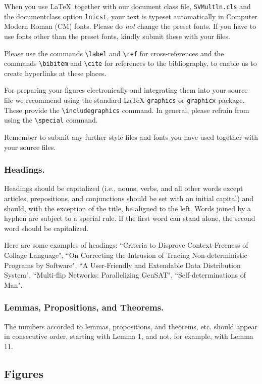 \documentclass[lnicst,sechang,a4paper]{svmultln}
\begin{document}
When you use \LaTeX\ together with our document class file,
\texttt{SVMultln.cls} and the documentclass option \texttt{lnicst},
your text is typeset automatically in Computer Modern Roman (CM) fonts.
Please do
\emph{not} change the preset fonts. If you have to use fonts other
than the preset fonts, kindly submit these with your files.

Please use the commands \verb+\label+ and \verb+\ref+ for
cross-references and the commands \verb+\bibitem+ and \verb+\cite+ for
references to the bibliography, to enable us to create hyperlinks at
these places.

For preparing your figures electronically and integrating them into
your source file we recommend using the standard \LaTeX{} \verb+graphics+ or
\verb+graphicx+ package. These provide the \verb+\includegraphics+ command.
In general, please refrain from using the \verb+\special+ command.

Remember to submit any further style files and
fonts you have used together with your source files.

\subsubsection{Headings.}

Headings should be capitalized
(i.e., nouns, verbs, and all other words
except articles, prepositions, and conjunctions should be set with an
initial capital) and should,
with the exception of the title, be aligned to the left.
Words joined by a hyphen are subject to a special rule. If the first
word can stand alone, the second word should be capitalized.

Here are some examples of headings: ``Criteria to Disprove
Context-Freeness of Collage Language", ``On Correcting the Intrusion of
Tracing Non-deterministic Programs by Software", ``A User-Friendly and
Extendable Data Distribution System", ``Multi-flip Networks:
Parallelizing GenSAT", ``Self-determinations of Man".

\subsubsection{Lemmas, Propositions, and Theorems.}

The numbers accorded to lemmas, propositions, and theorems, etc. should
appear in consecutive order, starting with Lemma 1, and not, for
example, with Lemma 11.

\subsection{Figures}
\end{document}
